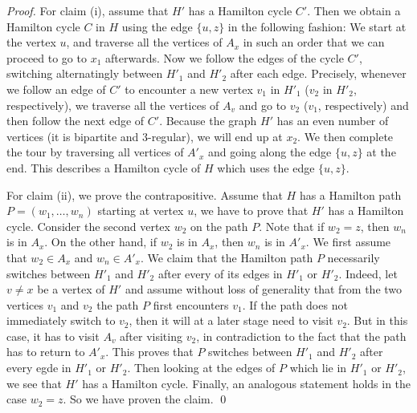 \documentclass[runningheads]{llncs}
\newcommand{\set}[1]{\{ #1 \}}
\newcommand{\lasse}[1]{#1}
\begin{document}
\begin{proof}
\lasse{
For claim (i), assume that $H'$ has a Hamilton cycle $C'$. Then we obtain a Hamilton cycle $C$ in $H$ using the edge $\set{u,z}$ in the following fashion: We start at the vertex $u$, and traverse all the vertices of $A_x$ in such an order that we can proceed to go to $x_1$ afterwards. Now we follow the edges of the cycle $C'$, switching alternatingly between $H'_1$ and $H'_2$ after each edge. Precisely, whenever we follow an edge of $C'$ to encounter a new vertex $v_1$ in $H'_1$ ($v_2$ in $H'_2$, respectively), we traverse all the vertices of $A_v$ and go to $v_2$ ($v_1$, respectively) and then follow the next edge of $C'$. Because the graph $H'$ has an even number of vertices (it is bipartite and 3-regular), we will end up at $x_2$. We then complete the tour by traversing all vertices of $A'_x$ and going along the edge $\set{u,z}$ at the end. This describes a Hamilton cycle of $H$ which uses the edge $\set{u,z}$.
}

\lasse{
For claim (ii), we prove the contrapositive. Assume that $H$ has a Hamilton path $P = (w_1,\dots,w_n)$ starting at vertex $u$, we have to prove that $H'$ has a Hamilton cycle. Consider the second vertex $w_2$ on the path $P$. Note that if $w_2 = z$, then $w_n$ is in $A_x$. On the other hand, if $w_2$ is in $A_x$, then $w_n$ is in $A'_x$. We first assume that $w_2 \in A_x$ and $w_n \in A'_x$.
We claim that the Hamilton path $P$ necessarily switches between $H'_1$ and $H'_2$ after every of its edges in $H'_1$ or $H'_2$. Indeed, let $v \neq x$ be a vertex of $H'$ and assume without loss of generality that from the two vertices $v_1$ and $v_2$ the path $P$ first encounters $v_1$. If the path does not immediately switch to $v_2$, then it will at a later stage need to visit $v_2$. But in this case, it has to visit $A_v$ after visiting $v_2$, in contradiction to the fact that the path has to return to $A'_x$. This proves that $P$ switches between $H'_1$ and $H'_2$ after every egde in $H'_1$ or $H'_2$. Then looking at the edges of $P$ which lie in $H'_1$ or $H'_2$, we see that $H'$ has a Hamilton cycle. Finally, an analogous statement holds in the case $w_2 = z$. So we have proven the claim. \qed
}
\end{proof}


\end{document}
